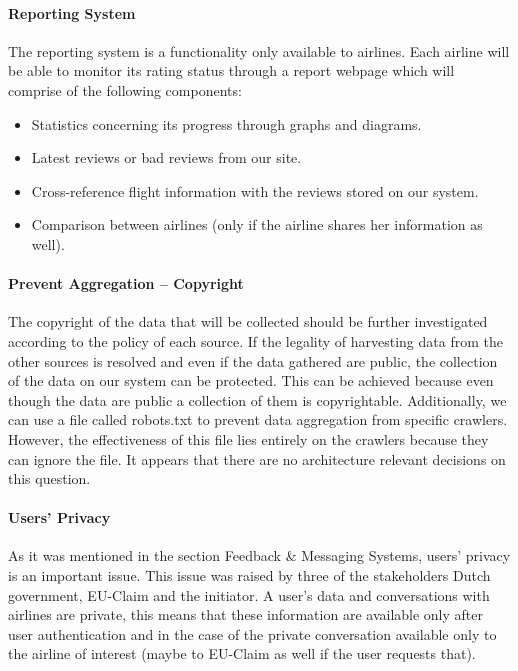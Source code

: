\documentclass{article}
\begin{document}
\paragraph{Reporting System} The reporting system is a functionality only available to airlines. Each airline will be able to monitor its rating status through a report webpage which will comprise of the following components:
\begin{itemize}
\item Statistics concerning its progress through graphs and diagrams.
\item Latest reviews or bad reviews from our site.
\item Cross-reference flight information with the reviews stored on our system.
\item Comparison between airlines (only if the airline shares her information as well).
\end{itemize}

\paragraph{Prevent Aggregation – Copyright} The copyright of the data that will be collected should be further investigated according to the policy of each source. If the legality of 
harvesting data from the other sources is resolved and even if the data gathered are public, the collection of the data on our system can be protected. This can be achieved because 
even though the data are public a collection of them is copyrightable. Additionally, we can use a file called robots.txt to prevent data aggregation from specific crawlers. However, 
the effectiveness of this file lies entirely on the crawlers because they can ignore the file. It appears that there are no architecture relevant decisions on this question.

\paragraph{Users' Privacy} As it was mentioned in the section Feedback \& Messaging Systems, users' privacy is an important issue. This issue was raised by three of the stakeholders 
Dutch government, EU-Claim and the initiator. A user's data and conversations with airlines are private, this means that these information are available only after user authentication 
and in the case of the private conversation available only to the airline of interest (maybe to EU-Claim as well if the user requests that). 
\end{document}
